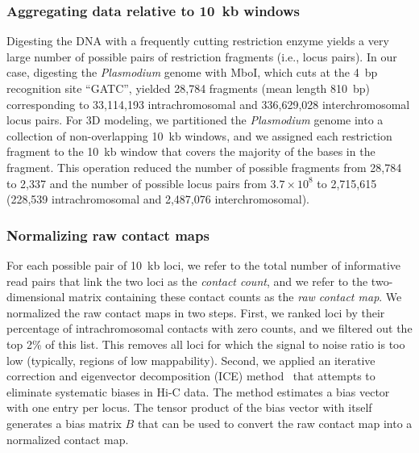 \subsubsection{Aggregating data relative to 10~kb windows}
\label{met:10kb}
Digesting the DNA with a frequently cutting restriction enzyme yields a very large
number of possible pairs of restriction fragments (i.e., locus pairs). In our case,
digesting the {\em Plasmodium} genome with MboI, which cuts at the 4~bp recognition
site ``GATC'', yielded 28,784 fragments (mean length 810~bp) corresponding to
33,114,193 intrachromosomal and 336,629,028 interchromosomal locus pairs. For 3D
modeling, we partitioned the {\em Plasmodium} genome into a collection of
non-overlapping 10~kb windows, and we assigned each restriction fragment to the
10~kb window that covers the majority of the bases in the fragment. This operation
reduced the number of possible fragments from 28,784 to 2,337 and the number of
possible locus pairs from $3.7 \times 10^8$ to 2,715,615 (228,539 intrachromosomal
and 2,487,076 interchromosomal).

\subsubsection{Normalizing raw contact maps}
\label{met:normalization}
For each possible pair of 10~kb loci, we refer to the total number of informative
read pairs that link the two loci as the {\em contact count}, and we refer to the
two-dimensional matrix containing these contact counts as the {\em raw contact map}.
We normalized the raw contact maps in two steps.  First, we ranked loci by their
percentage of intrachromosomal contacts with zero counts, and we filtered out the
top 2\% of this list. This removes all loci for which the signal to noise ratio
is too low (typically, regions of low mappability). Second, we applied an iterative
correction and eigenvector decomposition (ICE) method~\citep{imakaev:iterative}
that attempts to eliminate systematic biases in Hi-C data. The method estimates a
bias vector with one entry per locus. The tensor product of the bias vector with
itself generates a bias matrix $B$ that can be used to convert the raw contact map
into a normalized contact map.

